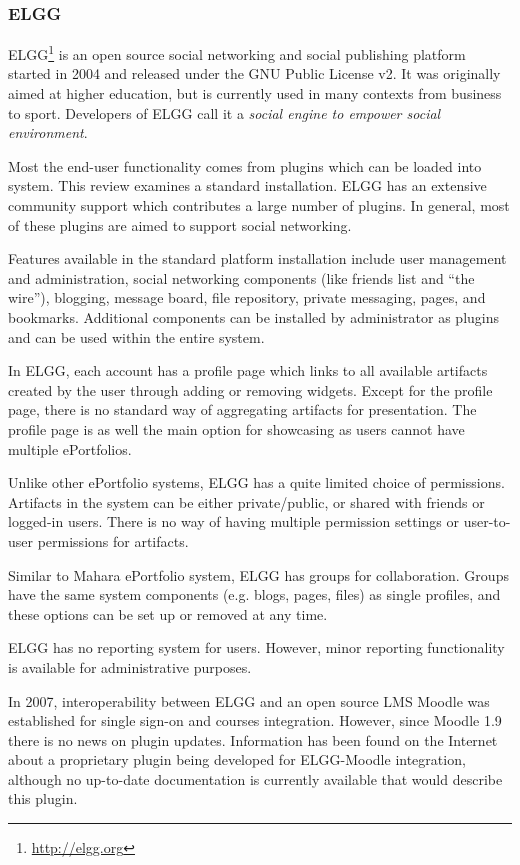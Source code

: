 \subsubsection{ELGG}
ELGG\footnote{\url{http://elgg.org}} is an open source social networking and
social publishing platform started in 2004 and released under the GNU Public
License v2. It was originally aimed at higher education, but is currently used
in many contexts from business to sport. Developers of ELGG call it a
\textit{social engine to empower social environment}.

Most the end-user functionality comes from plugins which can be loaded into
system. This review examines a standard installation. ELGG has an extensive
community support which contributes a large number of plugins. In general, most
of these plugins are aimed to support social networking.

Features available in the standard platform installation include user management
and administration, social networking components (like friends list and ``the
wire''), blogging, message board, file repository, private messaging, pages, and
bookmarks. Additional components can be installed by administrator as plugins
and can be used within the entire system.

In ELGG, each account has a profile page which links to all available artifacts
created by the user through adding or removing widgets. Except for the profile
page, there is no standard way of aggregating artifacts for presentation.
The profile page is as well the main option for showcasing as users cannot have
multiple ePortfolios.

Unlike other ePortfolio systems, ELGG has a quite limited choice of permissions.
Artifacts in the system can be either private/public, or shared with friends
or logged-in users. There is no way of having multiple permission settings or
user-to-user permissions for artifacts.

Similar to Mahara ePortfolio system, ELGG has groups for collaboration. Groups
have the same system components (e.g. blogs, pages, files) as single profiles,
and these options can be set up or removed at any time.

ELGG has no reporting system for users. However, minor reporting functionality
is available for administrative purposes.

In 2007, interoperability between ELGG and an open source LMS Moodle was
established for single sign-on and courses integration. However, since Moodle
1.9 there is no news on plugin updates. Information has been found on the
Internet about a proprietary plugin being developed for ELGG-Moodle integration,
although no up-to-date documentation is currently available that would describe
this plugin.

